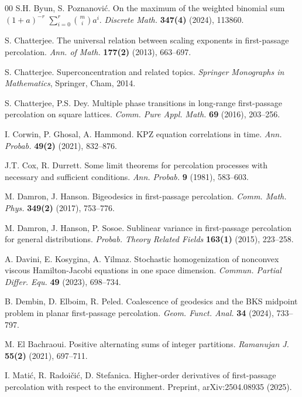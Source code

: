 \documentclass[reqno]{amsart}
\begin{document}
\begin{thebibliography}{00}
 S.H. Byun, S. Poznanovi\'c. On the maximum 
of the weighted binomial sum $(1+a)^{-r}$ $\sum_{i=0}^{r}\binom{m}{i}a^{i}$.
{\em Discrete Math.} {\bf 347(4)} (2024), 113860.

 S. Chatterjee. The universal relation between 
scaling exponents in first-passage percolation. {\em Ann. of Math.} 
{\bf 177(2)} (2013), 663--697.

 S. Chatterjee. Superconcentration and related 
topics. {\em Springer Monographs in Mathematics}, Springer, Cham, 2014.

 S. Chatterjee, P.S. Dey. Multiple phase 
transitions in long-range first-passage percolation on square lattices.
{\em Comm. Pure Appl. Math.} {\bf 69} (2016), 203--256.

 I. Corwin, P. Ghosal, A. Hammond. 
KPZ equation correlations in time. {\em Ann. Probab.} {\bf 49(2)} 
(2021), 832--876.

 J.T. Cox, R. Durrett. Some limit theorems for 
percolation processes with necessary and sufficient conditions. 
{\em Ann. Probab.} {\bf 9} (1981), 583--603.

 M. Damron, J. Hanson. Bigeodesics in 
first-passage percolation. {\em Comm. Math. Phys.} {\bf 349(2)} (2017), 
753--776.

 M. Damron, J. Hanson, P. Sosoe. 
Sublinear variance in first-passage percolation for general 
distributions. {\em Probab. Theory Related Fields} {\bf 163(1)} (2015), 
223--258.

 A. Davini, E. Kosygina, A. Yilmaz. 
Stochastic homogenization of nonconvex viscous Hamilton-Jacobi equations 
in one space dimension. {\em Commun. Partial Differ. Equ.} {\bf 49} 
(2023), 698--734.

 B. Dembin, D. Elboim, R. Peled. 
Coalescence of geodesics and the BKS midpoint problem in planar 
first-passage percolation. {\em Geom. Funct. Anal.} {\bf 34} (2024), 
733--797.

 M. El Bachraoui. Positive alternating sums of 
integer partitions. {\em Ramanujan J.} {\bf 55(2)} (2021), 697--711.

 I. Mati\'c, R. Radoi\v{c}i\'c, D. Stefanica.
Higher-order derivatives of first-passage percolation with respect to 
the environment.
Preprint, arXiv:2504.08935 (2025).


\end{thebibliography}
\end{document}
